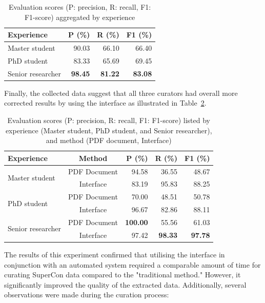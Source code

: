 \documentclass[a4paper]{article}
\begin{document}
\begin{table}[h]
\centering
\caption{Evaluation scores (P: precision, R: recall, F1: F1-score) aggregated by experience}
\begin{tabular}{lrrr}
\toprule
\textbf{Experience} & \textbf{P (\%)}   & \textbf{R (\%)}   & \textbf{F1 (\%)}  \\
\midrule
Master student      & 90.03             & 66.10             & 66.40             \\
PhD student         & 83.33             & 65.69             & 69.45             \\
Senior researcher   & \textbf{98.45}    & \textbf{81.22}    & \textbf{83.08}    \\
\bottomrule
\end{tabular}
\label{tab:accuracy-by-experience}
\end{table}

Finally, the collected data suggest that all three curators had overall more corrected results by using the interface as illustrated in Table~\ref{tab:accuracy-by-experience-method}. 

\begin{table}[h]
\centering\small
\caption{Evaluation scores (P: precision, R: recall, F1: F1-score) listed by experience (Master student, PhD student, and Senior researcher), and method (PDF document, Interface)}
\begin{tabular}{lcrrr}
\toprule
\textbf{Experience} & \textbf{Method} & \textbf{P (\%)} & \textbf{R (\%)} & 
\textbf{F1 (\%)} \\
\midrule
\multirow{2}{*}{Master student} & PDF Document & 94.58 & 36.55 & 48.67 \\
 & Interface & 83.19 & 95.83 & 88.25 \\
\midrule
\multirow{2}{*}{PhD student} & PDF Document & 70.00 & 48.51 & 50.78 \\
 & Interface & 96.67 & 82.86 & 88.11 \\
\midrule
\multirow{2}{*}{Senior researcher} & PDF Document & \textbf{100.00} & 55.56 & 61.03 \\
 & Interface & 97.42 & \textbf{98.33} & \textbf{97.78} \\
\bottomrule
\end{tabular}
\label{tab:accuracy-by-experience-method}
\end{table}


The results of this experiment confirmed that utilising the interface in conjunction with an automated system required a comparable amount of time for curating SuperCon data compared to the "traditional method." However, it significantly improved the quality of the extracted data.
Additionally, several observations were made during the curation process:
\end{document}
